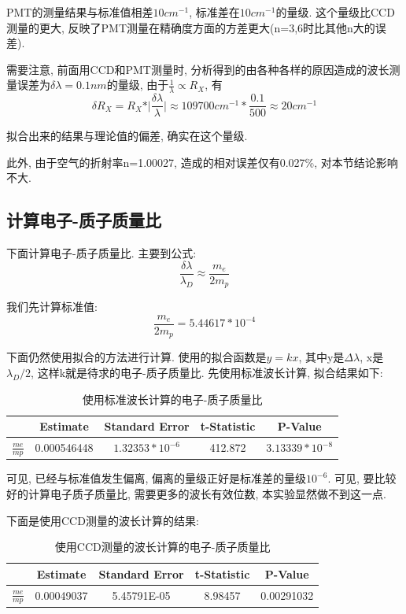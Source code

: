 \documentclass[12pt,a4paper]{article}
\begin{document}
PMT的测量结果与标准值相差$10cm^{-1}$, 标准差在$10cm^{-1}$的量级. 这个量级比CCD测量的更大, 反映了PMT测量在精确度方面的方差更大(n=3,6时比其他n大的误差). 

需要注意, 前面用CCD和PMT测量时, 分析得到的由各种各样的原因造成的波长测量误差为$\delta \lambda=0.1nm$的量级, 由于$\frac{1}{\lambda}\propto R_{X}$, 有
\begin{equation}
    \delta R_{X}=R_{X}*\vert\frac{\delta \lambda}{\lambda}\vert \approx 109700 cm^{-1} *\frac{0.1}{500}\approx 20 cm^{-1}
\end{equation}

拟合出来的结果与理论值的偏差, 确实在这个量级. 

此外, 由于空气的折射率n=1.00027, 造成的相对误差仅有0.027\%, 对本节结论影响不大. 
\subsection{计算电子-质子质量比}
下面计算电子-质子质量比. 主要到公式: 
\begin{equation}
    \frac{\delta \lambda}{\lambda_{D}} \approx \frac{m_{e}}{2 m_{p}}
\end{equation}

我们先计算标准值: 
\begin{equation}
    \frac{m_{e}}{2 m_{p}}=5.44617*10^{-4}
\end{equation}

下面仍然使用拟合的方法进行计算. 使用的拟合函数是$y=kx$, 其中y是$\Delta  \lambda$, x是$\lambda_{D}/2$, 这样k就是待求的电子-质子质量比. 
先使用标准波长计算, 拟合结果如下: 
\begin{table}[H]
    \centering
    \begin{tabular}{|c|c|c|c|c|}
    \hline
      & Estimate    & Standard Error                 & t-Statistic & P-Value                        \\ \hline
    $\frac{me}{mp}$ & 0.000546448 & $1.32353*10^{-6}$ & 412.872     & $3.13339*10^{-8}$ \\ \hline
    \end{tabular}
    \caption{使用标准波长计算的电子-质子质量比}
    \end{table}

可见, 已经与标准值发生偏离, 偏离的量级正好是标准差的量级$10^{-6}$. 可见, 要比较好的计算电子质子质量比, 需要更多的波长有效位数, 
本实验显然做不到这一点. 

下面是使用CCD测量的波长计算的结果: 
\begin{table}[H]
    \centering
    \begin{tabular}{|c|c|c|c|c|}
    \hline
      & Estimate   & Standard Error & t-Statistic & P-Value    \\ \hline
      $\frac{me}{mp}$ & 0.00049037 & 5.45791E-05    & 8.98457     & 0.00291032 \\ \hline
    \end{tabular}
    \caption{使用CCD测量的波长计算的电子-质子质量比}
    \end{table}
\end{document}
